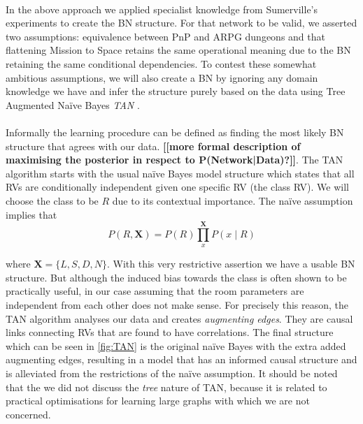 \documentclass{UoYCSproject}
\begin{document}
\paragraph{}
In the above approach we applied specialist knowledge from Sumerville's experiments to create the BN structure. For that network to be valid, we asserted two assumptions: equivalence between PnP and ARPG dungeons and that flattening Mission to Space retains the same operational meaning due to the BN retaining the same conditional dependencies. To contest these somewhat ambitious assumptions, we will also create a BN by ignoring any domain knowledge we have and infer the structure purely based on the data using Tree Augmented Na\"{i}ve Bayes \textit{TAN} \parencite{FriedmanTAN}.  
\paragraph{}
Informally the learning procedure can be defined as finding the most likely BN structure that agrees with our data. \textbf{[[more formal description of maximising the posterior in respect to P(Network|Data)?]]}. The TAN algorithm starts with the usual na\"{i}ve Bayes model structure which states that all RVs are conditionally independent given one specific RV (the class RV). We will choose the class to be \(R\) due to its contextual importance. The na\"{i}ve assumption implies that
\begin{equation}
  \label{eq:TAN}
  P(R,\boldsymbol X) = P(R)\prod_{x}^{\boldsymbol X} P(x \mid R)
\end{equation}

where \(\boldsymbol X = \{L, S, D, N\}\). With this very restrictive assertion we have a usable BN structure. But although the induced bias towards the class is often shown to be practically useful, in our case assuming that the room parameters are independent from each other does not make sense. For precisely this reason, the TAN algorithm analyses our data and creates \textit{augmenting edges}. They are causal links connecting RVs that are found to have correlations. The final structure which can be seen in \ref{fig:TAN} is the original na\"{i}ve Bayes with the extra added augmenting edges, resulting in a model that has an informed causal structure and is alleviated from the restrictions of the na\"{i}ve assumption. It should be noted that the we did not discuss the \textit{tree} nature of TAN, because it is related to practical optimisations for learning large graphs with which we are not concerned.
\end{document}
